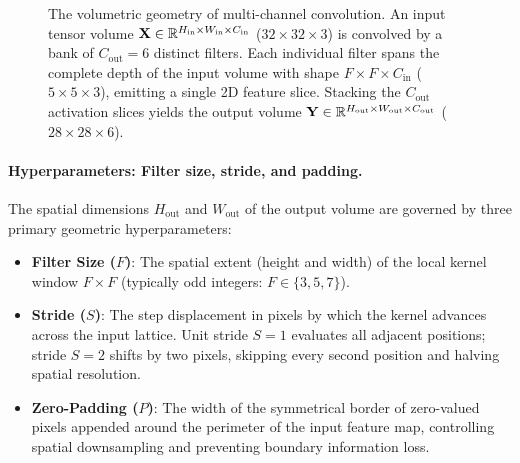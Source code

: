 \begin{figure}[H]
\caption{The volumetric geometry of multi-channel convolution. An input tensor volume $\mathbf{X} \in \mathbb{R}^{H_{\text{in}} \times W_{\text{in}} \times C_{\text{in}}}$ ($32 \times 32 \times 3$) is convolved by a bank of $C_{\text{out}} = 6$ distinct filters. Each individual filter spans the complete depth of the input volume with shape $F \times F \times C_{\text{in}}$ ($5 \times 5 \times 3$), emitting a single 2D feature slice. Stacking the $C_{\text{out}}$ activation slices yields the output volume $\mathbf{Y} \in \mathbb{R}^{H_{\text{out}} \times W_{\text{out}} \times C_{\text{out}}}$ ($28 \times 28 \times 6$).}
\label{fig:volumetric_convolution}
\end{figure}

\paragraph{Hyperparameters: Filter size, stride, and padding.}
The spatial dimensions $H_{\text{out}}$ and $W_{\text{out}}$ of the output volume are governed by three primary geometric hyperparameters:
\begin{itemize}[leftmargin=*]
  \item \textbf{Filter Size ($F$)}: The spatial extent (height and width) of the local kernel window $F \times F$ (typically odd integers: $F \in \{3, 5, 7\}$).
  \item \textbf{Stride ($S$)}: The step displacement in pixels by which the kernel advances across the input lattice. Unit stride $S = 1$ evaluates all adjacent positions; stride $S = 2$ shifts by two pixels, skipping every second position and halving spatial resolution.
  \item \textbf{Zero-Padding ($P$)}: The width of the symmetrical border of zero-valued pixels appended around the perimeter of the input feature map, controlling spatial downsampling and preventing boundary information loss.
\end{itemize}

